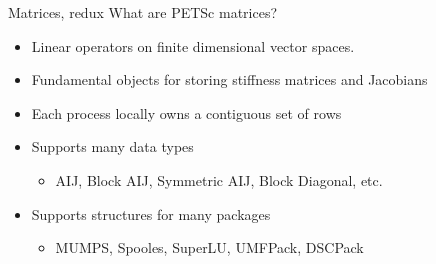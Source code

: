 \begin{frame}{Matrices, redux}
What are PETSc matrices?
\begin{itemize}
\item Linear operators on finite dimensional vector spaces.
  \item<2> Fundamental objects for storing stiffness matrices and Jacobians
  \item<2> Each process locally owns a contiguous set of rows
  \item<2> Supports many data types
  \begin{itemize}
    \item AIJ, Block AIJ, Symmetric AIJ, Block Diagonal, etc.
  \end{itemize}
  \item<2> Supports structures for many packages
  \begin{itemize}
    \item MUMPS, Spooles, SuperLU, UMFPack, DSCPack
  \end{itemize}
\end{itemize}
\end{frame}
